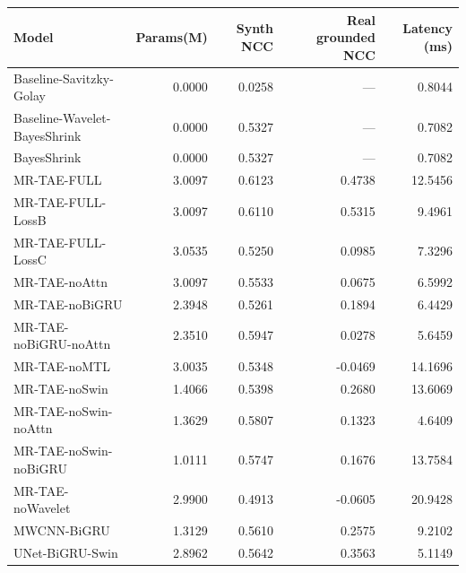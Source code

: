 \begin{tabular}{lrrrr}
\hline
Model & Params(M) & Synth NCC & Real grounded NCC & Latency (ms)\\
\hline
Baseline-Savitzky-Golay & 0.0000 & 0.0258 & — & 0.8044\\
Baseline-Wavelet-BayesShrink & 0.0000 & 0.5327 & — & 0.7082\\
BayesShrink & 0.0000 & 0.5327 & — & 0.7082\\
MR-TAE-FULL & 3.0097 & 0.6123 & 0.4738 & 12.5456\\
MR-TAE-FULL-LossB & 3.0097 & 0.6110 & 0.5315 & 9.4961\\
MR-TAE-FULL-LossC & 3.0535 & 0.5250 & 0.0985 & 7.3296\\
MR-TAE-noAttn & 3.0097 & 0.5533 & 0.0675 & 6.5992\\
MR-TAE-noBiGRU & 2.3948 & 0.5261 & 0.1894 & 6.4429\\
MR-TAE-noBiGRU-noAttn & 2.3510 & 0.5947 & 0.0278 & 5.6459\\
MR-TAE-noMTL & 3.0035 & 0.5348 & -0.0469 & 14.1696\\
MR-TAE-noSwin & 1.4066 & 0.5398 & 0.2680 & 13.6069\\
MR-TAE-noSwin-noAttn & 1.3629 & 0.5807 & 0.1323 & 4.6409\\
MR-TAE-noSwin-noBiGRU & 1.0111 & 0.5747 & 0.1676 & 13.7584\\
MR-TAE-noWavelet & 2.9900 & 0.4913 & -0.0605 & 20.9428\\
MWCNN-BiGRU & 1.3129 & 0.5610 & 0.2575 & 9.2102\\
UNet-BiGRU-Swin & 2.8962 & 0.5642 & 0.3563 & 5.1149\\
\hline
\end{tabular}
